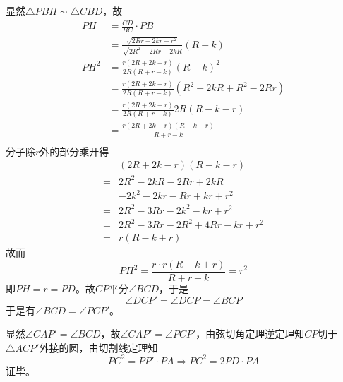 显然$\triangle PBH \sim \triangle CBD$，故
\begin{align*}
  PH &= \frac{CD}{BC}\cdot PB \\
  &= \frac{\sqrt{2Rr + 2kr - r^2}}{\sqrt{2R^2 + 2Rr - 2kR}}(R - k) \\
  PH^2 &= \frac{r(2R + 2k - r)}{2R(R + r - k)}(R - k)^2 \\
  &= \frac{r(2R + 2k - r)}{2R(R + r - k)}\left(R^2 - 2kR + R^2 - 2Rr\right) \\
  &= \frac{r(2R + 2k - r)}{2R(R + r - k)}2R(R - k - r) \\
  &= \frac{r(2R + 2k - r)(R - k - r)}{R + r - k} \\
\end{align*}
分子除$r$外的部分乘开得
\begin{align*}
  & (2R + 2k - r)(R - k - r) \\
  ={}& 2R^2 - 2kR - 2Rr + 2kR \\
  &- 2k^2 - 2kr - Rr + kr + r^2 \\
  ={}& 2R^2 - 3Rr - 2k^2 - kr + r^2 \\
  ={}& 2R^2 - 3Rr - 2R^2 + 4Rr - kr + r^2 \\
  ={}& r(R - k + r)
\end{align*}
故而
\[ PH^2 = \frac{r\cdot r(R - k + r)}{R + r - k} = r^2 \]
即$PH = r = PD$。故$CP$平分$\angle BCD$，于是
\[ \angle DCP' = \angle DCP = \angle BCP \]
于是有$\angle BCD = \angle PCP'$。

显然$\angle CAP' = \angle BCD$，故$\angle CAP' = \angle PCP'$，由弦切角定理逆定理知$CP$切于$\triangle ACP'$外接的圆，由切割线定理知
\[ PC^2 = PP'\cdot PA \Rightarrow PC^2 = 2PD\cdot PA \]
证毕。
